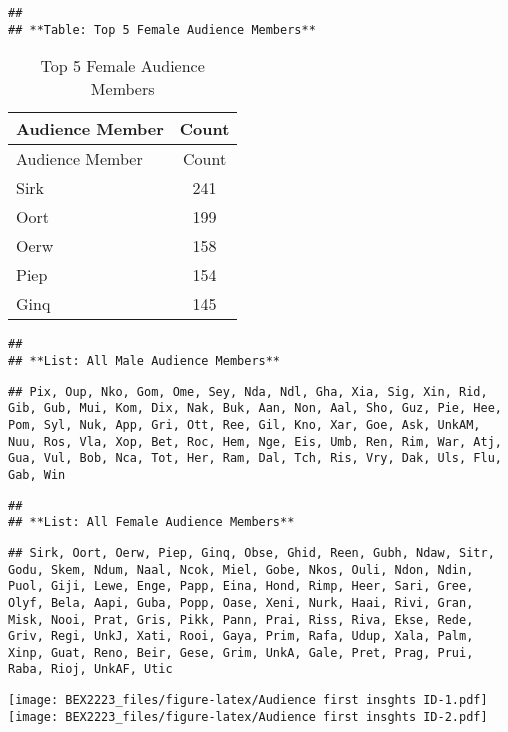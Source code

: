 \documentclass[
]{article}
\begin{document}
\begin{verbatim}
## 
## **Table: Top 5 Female Audience Members**
\end{verbatim}

\begin{longtable}[]{@{}lc@{}}
\caption{Top 5 Female Audience Members}\tabularnewline
\toprule
Audience Member & Count \\
\midrule
\endfirsthead
\toprule
Audience Member & Count \\
\midrule
\endhead
Sirk & 241 \\
Oort & 199 \\
Oerw & 158 \\
Piep & 154 \\
Ginq & 145 \\
\bottomrule
\end{longtable}

\begin{verbatim}
## 
## **List: All Male Audience Members**
\end{verbatim}

\begin{verbatim}
## Pix, Oup, Nko, Gom, Ome, Sey, Nda, Ndl, Gha, Xia, Sig, Xin, Rid, Gib, Gub, Mui, Kom, Dix, Nak, Buk, Aan, Non, Aal, Sho, Guz, Pie, Hee, Pom, Syl, Nuk, App, Gri, Ott, Ree, Gil, Kno, Xar, Goe, Ask, UnkAM, Nuu, Ros, Vla, Xop, Bet, Roc, Hem, Nge, Eis, Umb, Ren, Rim, War, Atj, Gua, Vul, Bob, Nca, Tot, Her, Ram, Dal, Tch, Ris, Vry, Dak, Uls, Flu, Gab, Win
\end{verbatim}

\begin{verbatim}
## 
## **List: All Female Audience Members**
\end{verbatim}

\begin{verbatim}
## Sirk, Oort, Oerw, Piep, Ginq, Obse, Ghid, Reen, Gubh, Ndaw, Sitr, Godu, Skem, Ndum, Naal, Ncok, Miel, Gobe, Nkos, Ouli, Ndon, Ndin, Puol, Giji, Lewe, Enge, Papp, Eina, Hond, Rimp, Heer, Sari, Gree, Olyf, Bela, Aapi, Guba, Popp, Oase, Xeni, Nurk, Haai, Rivi, Gran, Misk, Nooi, Prat, Gris, Pikk, Pann, Prai, Riss, Riva, Ekse, Rede, Griv, Regi, UnkJ, Xati, Rooi, Gaya, Prim, Rafa, Udup, Xala, Palm, Xinp, Guat, Reno, Beir, Gese, Grim, UnkA, Gale, Pret, Prag, Prui, Raba, Rioj, UnkAF, Utic
\end{verbatim}

\texttt{[image: BEX2223\_files/figure-latex/Audience first insghts ID-1.pdf]}
\texttt{[image: BEX2223\_files/figure-latex/Audience first insghts ID-2.pdf]}
\end{document}
